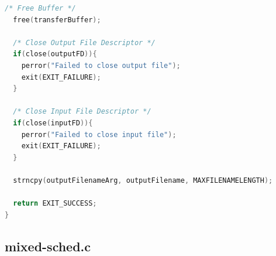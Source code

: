 \documentclass{article}
\begin{document}
\begin{lstlisting}[language=c]
  /* Free Buffer */
  free(transferBuffer);

  /* Close Output File Descriptor */
  if(close(outputFD)){
  	perror("Failed to close output file");
  	exit(EXIT_FAILURE);
  }

  /* Close Input File Descriptor */
  if(close(inputFD)){
  	perror("Failed to close input file");
  	exit(EXIT_FAILURE);
  }

  strncpy(outputFilenameArg, outputFilename, MAXFILENAMELENGTH);

  return EXIT_SUCCESS;
}

\end{lstlisting}

\subsection{mixed-sched.c}
\end{document}
